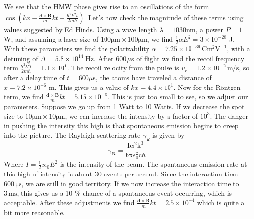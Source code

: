 \documentclass[twocolumn,english,pra,aps,superscriptaddress,floatfix]{revtex4-1}
\begin{document}
We see that the HMW phase gives rise to an oscillations of the form $\cos{\left(kx-\frac{\mathbf{d}\times\mathbf{B}}{m}kt-\frac{\hbar^2k^2t}{2m\hbar}\right)}$. Let's now check the magnitude of these terms using values suggested by Ed Hinds. Using a wave length $\lambda=1030$nm, a power $P=1$W, and assuming a laser size of $\mathrm{100\mu m \times 100\mu m}$, we find $\frac{1}{2}\alpha E^2=3\times 10^{-28}$ J. With these parameters we find the polarizability $\alpha =7.25\times 10^{-39} \,\mathrm{C  m^2  V^{-1}}$, with a detuning of $\Delta=5.8\times10^{14}$ Hz. After $600\,\mu$s of flight we find the recoil frequency term $\frac{\hbar^2k^2t}{2m\hbar}=1.1\times 10^1$. The recoil velocity from the pulse is $v_r=1.2\times 10^{-2}\,\mathrm{m/s}$, so after a delay time of $t=600\mu$s, the atoms have traveled a distance of $x=7.2\times 10^{-6}$ m.  This gives us a value of $kx=4.4\times 10^1$.  Now for the R\"{o}ntgen term, we find $\frac{\mathbf{d}\times\mathbf{B}}{m}kt=5.15 \times 10^{-8}$.  This is just too small to see, so we adjust our parameters.  Suppose we go up from 1 Watt to 10 Watts.  If we decrease the spot size to $10\mathrm{\mu m \times 10\mu m}$, we can increase the intensity by a factor of $10^3$.  The danger in pushing the intensity this high is that spontaneous emission begins to creep into the picture. The Rayleigh scattering rate $\gamma_{R}$
is given by
\begin{equation}
\mathrm{\gamma_{R}=\frac{I\alpha ^2 k^3}{6 \pi\epsilon_{0}^2 c\hbar}}
\label{scatter}
\end{equation}
Where $I=\frac{1}{2}c\epsilon_0 E^2$ is the intensity of the beam. The spontaneous emission rate at this high of intensity is about 30 events per second.  Since the interaction time $600\, \mathrm{\mu s}$, we are still in good territory. If we now increase the interaction time to $3\, \mathrm{ms}$, this gives us a 10 $\%$ chance of a spontaneous event occurring, which is acceptable. After these adjustments we find $\frac{\mathbf{d}\times\mathbf{B}}{m}kt=2.5 \times 10^{-4}$ which is quite a bit more reasonable.  
\vspace{2mm}


\end{document}

